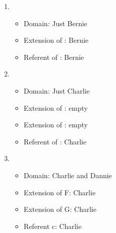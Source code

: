 \begin{enumerate}
   \begin{enumerate}

	\item {}

	 \opts{

	  \dotline
	  \dotline
	  \dotline
	  \dotline
	  \dotline

	 }
	 {
	  \begin{itemize}

	  \item Domain: Just Bernie

	  \item Extension of : Bernie

	  \item Referent of : Bernie
	  \end{itemize}


	 }

	\item {}

	 \opts{

	  \dotline
	  \dotline
	  \dotline
	  \dotline
	  \dotline

	 }
	 {
	\begin{itemize}

	 \item Domain: Just Charlie

	 \item Extension of : empty

	 \item Extension of : empty

	 \item Referent of : Charlie

	\end{itemize}
	 }

	\item {}

	 \opts{

	  \dotline
	  \dotline
	  \dotline
	  \dotline
	  \dotline

	 }
	 {

	 \begin{itemize}

	  \item Domain: Charlie and Dannie

	  \item Extension of F: Charlie

	  \item Extension of G: Charlie

	  \item Referent c: Charlie


\end{itemize}}
\end{enumerate}
\end{enumerate}
